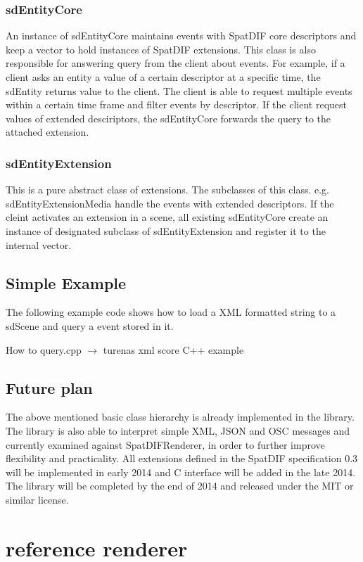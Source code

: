 \documentclass[a4paper]{article}
\begin{document}
\subsubsection{sdEntityCore}
An instance of sdEntityCore maintains events with SpatDIF core descriptors and keep a vector to hold instances of SpatDIF extensions. This class is also responsible for answering query from the client about events. For example, if a client asks an entity a value of a certain descriptor at a specific time, the sdEntity returns value to the client. The client is able to request multiple events within a certain time frame and filter events by descriptor. If the client request values of extended desciriptors, the sdEntityCore forwards the query to the attached extension.

\subsubsection{sdEntityExtension}
This is a pure abstract class of extensions. The subclasses of this class. e.g. sdEntityExtensionMedia handle the events with extended descriptors. If the cleint activates an extension in a scene, all existing sdEntityCore create an instance of designated subclass of sdEntityExtension and register it to the internal vector.

\subsection{Simple Example}
The following example code shows how to load a XML formatted string to a sdScene and query a event stored in it.

How to query.cpp
$\rightarrow$ turenas xml score C++ example

\subsection{Future plan}

The above mentioned basic class hierarchy is already implemented in the library. The library is also able to interpret simple XML, JSON and OSC messages and currently examined against SpatDIFRenderer, in order to further improve flexibility and practicality.  All extensions defined in the SpatDIF specification 0.3 will be implemented in early 2014 and C interface will be added in the late 2014. The library will be completed by the end of 2014 and released under the MIT or similar license.

\section{reference renderer }%
\end{document}
